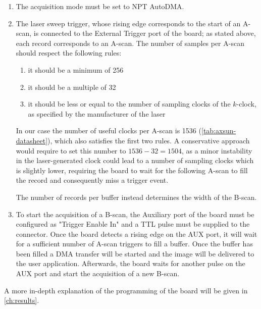     \begin{enumerate}
    	
    	\item The acquisition mode must be set to NPT AutoDMA.
    	
    	\item The laser sweep trigger, whose rising edge corresponds to the start of an A-scan, is connected to the External Trigger port of the board; as stated above, each record corresponds to an A-scan. The number of samples per A-scan should respect the following rules:
    	\begin{enumerate}
    		\item it should be a minimum of 256
    		\item it should be a multiple of 32
    		\item it should be less or equal to the number of sampling clocks of the $k$-clock, as specified by the manufacturer of the laser
    	\end{enumerate}
    
    	In our case the number of useful clocks per A-scan is 1536 (\autoref{tab:axsun-datasheet}), which also satisfies the first two rules. A conservative approach would require to set this number to $1536-32 =1504$, as a minor instability in the laser-generated clock could lead to a number of sampling clocks which is slightly lower, requiring the board to wait for the following A-scan to fill the record and consequently miss a trigger event. 
    	
    	The number of records per buffer instead determines the width of the B-scan. 
    	
    	\item  To start the acquisition of a B-scan, the Auxiliary port of the board must be configured as "Trigger Enable In" and a TTL pulse must be supplied to the connector. Once the board detects a rising edge on the AUX port, it will wait for a sufficient number of A-scan triggers to fill a buffer. Once the buffer has been filled a DMA transfer will be started and the image will be delivered to the user application.
    	Afterwards, the board waits for another pulse on the AUX port and start the acquisition of a new B-scan. 
    \end{enumerate}
    
    A more in-depth explanation of the programming of the board will be given in \autoref{ch:results}.
    
